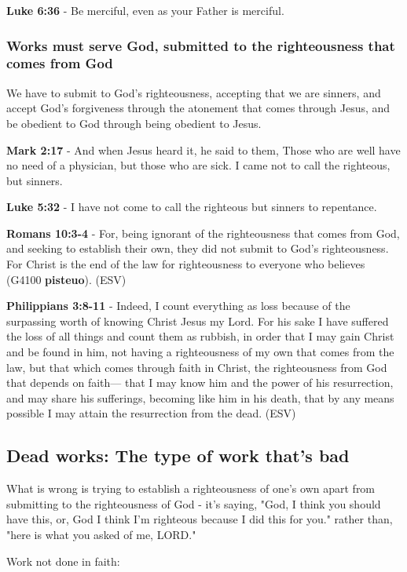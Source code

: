 \documentclass[11pt]{article}
\begin{document}
\textbf{Luke 6:36} - Be merciful, even as your Father is merciful.

\subsubsection{Works must serve God, submitted to the righteousness that comes from God}
\label{sec:org6606f0c}

We have to submit to God's righteousness, accepting that we are sinners, and accept God's forgiveness through the atonement that comes through Jesus, and be obedient to God through being obedient to Jesus.

\textbf{Mark 2:17} - And when Jesus heard it, he said to them, Those who are well have no need of a physician, but those who are sick. I came not to call the righteous, but sinners.

\textbf{Luke 5:32} - I have not come to call the righteous but sinners to repentance.

\textbf{Romans 10:3-4} - For, being ignorant of the righteousness that comes from God, and seeking to establish their own, they did not submit to God's righteousness. For Christ is the end of the law for righteousness to everyone who believes (G4100 \textbf{pisteuo}). (ESV)

\textbf{Philippians 3:8-11} - Indeed, I count everything as loss because of the surpassing worth of knowing Christ Jesus my Lord. For his sake I have suffered the loss of all things and count them as rubbish, in order that I may gain Christ and be found in him, not having a righteousness of my own that comes from the law, but that which comes through faith in Christ, the righteousness from God that depends on faith— that I may know him and the power of his resurrection, and may share his sufferings, becoming like him in his death, that by any means possible I may attain the resurrection from the dead. (ESV)

\subsection{Dead works: The type of work that's bad}
\label{sec:org9cedbc2}
What is wrong is trying to establish a righteousness of one's own apart from submitting to the righteousness of God - it's saying, "God, I think you should have this, or, God I think I'm righteous because I did this for you." rather than, "here is what you asked of me, LORD."

Work not done in faith:
\end{document}
